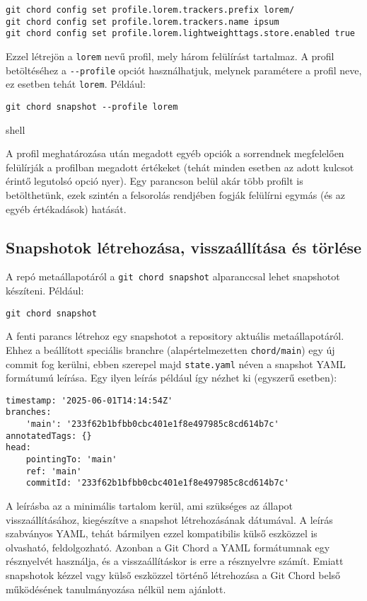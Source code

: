 \documentclass[
]{elteikthesis}[2025/03/25]
\begin{document}
\begin{verbatim}
git chord config set profile.lorem.trackers.prefix lorem/
git chord config set profile.lorem.trackers.name ipsum
git chord config set profile.lorem.lightweighttags.store.enabled true
\end{verbatim}

Ezzel létrejön a \verb|lorem| nevű profil, mely három felülírást tartalmaz.
A profil betöltéséhez a \verb|--profile| opciót használhatjuk,
melynek paramétere a profil neve, ez esetben tehát \verb|lorem|.
Például:

\begin{verbatim}
git chord snapshot --profile lorem
\end{verbatim}{shell}

A profil meghatározása után megadott egyéb opciók a sorrendnek megfelelően
felülírják a profilban megadott értékeket
(tehát minden esetben az adott kulcsot érintő legutolsó opció nyer).
Egy parancson belül akár több profilt is betölthetünk,
ezek szintén a felsorolás rendjében fogják felülírni egymás (és az egyéb értékadások) hatását.

\subsection{Snapshotok létrehozása, visszaállítása és törlése}

A repó metaállapotáról a \verb|git chord snapshot| alparanccsal lehet snapshotot készíteni.
Például:

\begin{verbatim}
git chord snapshot
\end{verbatim}

A fenti parancs létrehoz egy snapshotot a repository aktuális metaállapotáról.
Ehhez a beállított speciális branchre (alapértelmezetten \verb|chord/main|) egy új commit fog kerülni,
ebben szerepel majd \verb|state.yaml| néven a snapshot YAML formátumú leírása.
Egy ilyen leírás például így nézhet ki (egyszerű esetben):

\begin{verbatim}
timestamp: '2025-06-01T14:14:54Z'
branches:
    'main': '233f62b1bfbb0cbc401e1f8e497985c8cd614b7c'
annotatedTags: {}
head:
    pointingTo: 'main'
    ref: 'main'
    commitId: '233f62b1bfbb0cbc401e1f8e497985c8cd614b7c'
\end{verbatim}

A leírásba az a minimális tartalom kerül, ami szükséges az állapot visszaállításához,
kiegészítve a snapshot létrehozásának dátumával.
A leírás szabványos YAML, tehát bármilyen ezzel kompatibilis
külső eszközzel is olvasható, feldolgozható.
Azonban a Git Chord a YAML formátumnak egy résznyelvét használja,
és a visszaállításkor is erre a résznyelvre számít.
Emiatt snapshotok kézzel vagy külső eszközzel történő létrehozása
a Git Chord belső működésének tanulmányozása nélkül nem ajánlott.
\end{document}
